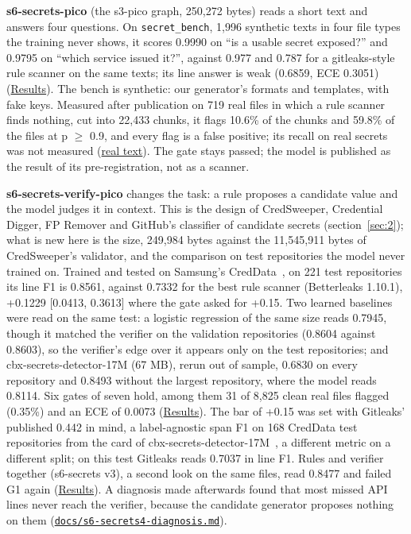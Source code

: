 \documentclass[10pt]{article}
\begin{document}
\textbf{s6-secrets-pico} (the s3-pico graph, 250,272 bytes) reads a short text and answers four questions. On \texttt{secret\_\allowbreak{}bench}, 1,996 synthetic texts in four file types the training never shows, it scores 0.9990 on ``is a usable secret exposed?'' and 0.9795 on ``which service issued it?'', against 0.977 and 0.787 for a gitleaks-style rule scanner on the same texts; its line answer is weak (0.6859, ECE 0.3051) (\href{https://maxgfr.github.io/skycmd/results/\#s6-secrets-pico-passed-published-at-full-depth}{Results}). The bench is synthetic: our generator's formats and templates, with fake keys. Measured after publication on 719 real files in which a rule scanner finds nothing, cut into 22,433 chunks, it flags 10.6\% of the chunks and 59.8\% of the files at p $\geq$ 0.9, and every flag is a false positive; its recall on real secrets was not measured (\href{https://maxgfr.github.io/skycmd/results/\#s6-secrets-real-text}{real text}). The gate stays passed; the model is published as the result of its pre-registration, not as a scanner.

\textbf{s6-secrets-verify-pico} changes the task: a rule proposes a candidate value and the model judges it in context. This is the design of CredSweeper, Credential Digger, FP Remover and GitHub's classifier of candidate secrets (section~\ref{sec:2}); what is new here is the size, 249,984 bytes against the 11,545,911 bytes of CredSweeper's validator, and the comparison on test repositories the model never trained on. Trained and tested on Samsung's CredData~\cite{creddata}, on 221 test repositories its line F1 is 0.8561, against 0.7332 for the best rule scanner (Betterleaks 1.10.1), +0.1229 [0.0413, 0.3613] where the gate asked for +0.15. Two learned baselines were read on the same test: a logistic regression of the same size reads 0.7945, though it matched the verifier on the validation repositories (0.8604 against 0.8603), so the verifier's edge over it appears only on the test repositories; and cbx-secrets-detector-17M (67 MB), rerun out of sample, 0.6830 on every repository and 0.8493 without the largest repository, where the model reads 0.8114. Six gates of seven hold, among them 31 of 8,825 clean real files flagged (0.35\%) and an ECE of 0.0073 (\href{https://maxgfr.github.io/skycmd/results/\#s6-secrets-verify-pico-failed}{Results}). The bar of +0.15 was set with Gitleaks' published 0.442 in mind, a label-agnostic span F1 on 168 CredData test repositories from the card of cbx-secrets-detector-17M~\cite{cbx17m}, a different metric on a different split; on this test Gitleaks reads 0.7037 in line F1. Rules and verifier together (s6-secrets v3), a second look on the same files, read 0.8477 and failed G1 again (\href{https://maxgfr.github.io/skycmd/results/\#s6-secrets-verify-pico-failed}{Results}). A diagnosis made afterwards found that most missed API lines never reach the verifier, because the candidate generator proposes nothing on them (\href{https://github.com/maxgfr/skycmd/blob/main/docs/s6-secrets4-diagnosis.md}{\texttt{docs/\allowbreak{}s6-secrets4-diagnosis.md}}).
\end{document}
